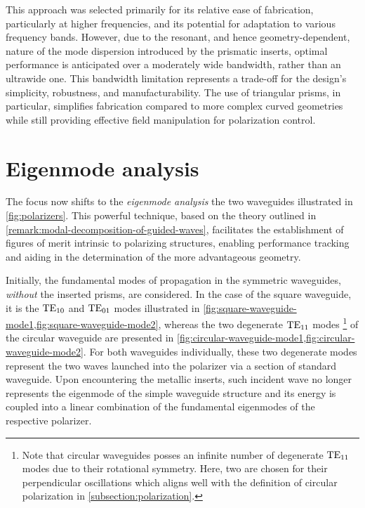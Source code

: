 \documentclass[11pt,a4paper,twoside,openany]{report}
\begin{document}
This approach was selected primarily for its relative ease of fabrication, particularly at higher frequencies, and its potential for adaptation to various frequency bands. However, due to the resonant, and hence geometry-dependent, nature of the mode dispersion introduced by the prismatic inserts, optimal performance is anticipated over a moderately wide bandwidth, rather than an ultrawide one. This bandwidth limitation represents a trade-off for the design's simplicity, robustness, and manufacturability. The use of triangular prisms, in particular, simplifies fabrication compared to more complex curved geometries while still providing effective field manipulation for polarization control.

\section{Eigenmode analysis}
The focus now shifts to the \emph{eigenmode analysis} the two waveguides illustrated in \cref{fig:polarizers}. This powerful technique, based on the theory outlined in \cref{remark:modal-decomposition-of-guided-waves}, facilitates the establishment of figures of merit intrinsic to polarizing structures, enabling performance tracking and aiding in the determination of the more advantageous geometry.

Initially, the fundamental modes of propagation in the symmetric waveguides, \emph{without} the inserted prisms, are considered. In the case of the square waveguide, it is the $\text{TE}_{10}$ and $\text{TE}_{01}$ modes illustrated in \cref{fig:square-waveguide-mode1,fig:square-waveguide-mode2}, whereas the two degenerate $\text{TE}_{11}$ modes%
    \footnote{Note that circular waveguides posses an infinite number of degenerate $\text{TE}_{11}$ modes due to their rotational symmetry. Here, two are chosen for their perpendicular oscillations which aligns well with the definition of circular polarization in \cref{subsection:polarization}.}
of the circular waveguide are presented in \cref{fig:circular-waveguide-mode1,fig:circular-waveguide-mode2}. For both waveguides individually, these two degenerate modes represent the two waves launched into the polarizer via a section of standard waveguide. Upon encountering the metallic inserts, such incident wave no longer represents the eigenmode of the simple waveguide structure and its energy is coupled into a linear combination of the fundamental eigenmodes of the respective polarizer.
\end{document}
